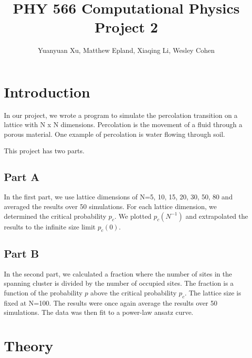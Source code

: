\documentclass[12pt]{article}
\begin{document}
	
\title{PHY 566 Computational Physics Project 2}
\author{Yuanyuan Xu, Matthew Epland, Xiaqing Li, Wesley Cohen}
\maketitle

\section{Introduction}
\indent \indent In our project, we wrote a program to simulate the percolation transition on a lattice with N x N dimensions. Percolation is the movement of a fluid through a porous material. One example of percolation is water flowing through soil.  

This project has two parts.

\subsection{Part A}
\indent \indent In the first part, we use lattice dimensions of N=5, 10, 15, 20, 30, 50, 80 and averaged the results over 50 simulations. For each lattice dimension, we determined the critical probability $p_c$. We plotted $p_c(N^{-1})$ and extrapolated the results to the infinite size limit $p_c(0)$.

\subsection{Part B}
\indent \indent In the second part, we calculated a fraction where the number of sites in the spanning cluster is divided by the number of occupied sites. The fraction is a function of the probability $p$ above the critical probability $p_c$. The lattice size is fixed at N=100. The results were once again average the results over 50 simulations. The data was then fit to a power-law ansatz curve.

\section{Theory}
\end{document}
